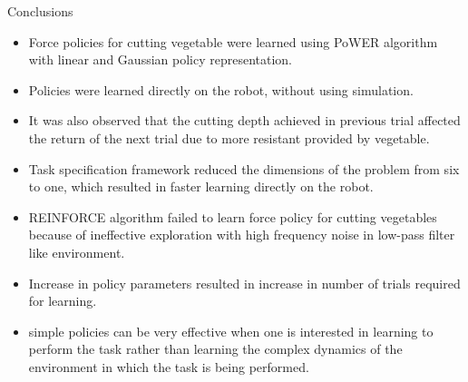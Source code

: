 \documentclass[aspectratio=43,10pt,fleqn,t]{beamer}
\begin{document}
\begin{frame}{Conclusions}
	
	
	\begin{minipage}[t]{0.51\textwidth}
		\begin{itemize}
			\small  
			\item Force policies for cutting vegetable were learned using PoWER algorithm with linear and Gaussian policy representation.
			\item Policies were learned directly on the robot, without using simulation.
			\item It was also observed that the cutting depth achieved in previous trial affected the return of the next trial due to more resistant provided by vegetable.
			\item Task specification framework reduced the dimensions of the problem from six to one, which resulted in faster learning directly on the robot.
		\end{itemize}
	\end{minipage}
	\hfill
	\begin{minipage}[t]{0.47\textwidth}
		\begin{itemize}
			\small 
			\item REINFORCE algorithm failed to learn force policy for cutting vegetables because of ineffective exploration with high frequency noise in low-pass filter like environment.
			\item Increase in policy parameters resulted in increase in number of trials required for learning.
			\item simple policies can be very effective when one is interested in learning to perform the task rather than learning the complex dynamics of the environment in which the task is being performed.
		\end{itemize}
	\end{minipage}
\end{frame}
\end{document}
